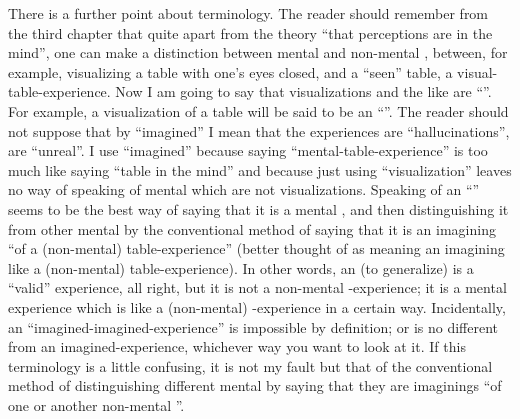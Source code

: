 There is a further point about terminology. The reader should remember from the third chapter that quite apart from the theory \enquote{that perceptions are in the mind}, one can make a distinction between mental and non-mental , between, for example, visualizing a table with one's eyes closed, and a \enquote{seen} table, a visual-table-experience. Now I am going to say that visualizations and the like are \enquote{}. For example, a visualization of a table will be said to be an \enquote{}. The reader should not suppose that by \enquote{imagined} I mean that the experiences are \enquote{hallucinations}, are \enquote{unreal}. I use \enquote{imagined} because saying \enquote{mental-table-experience} is too much like saying \enquote{table in the mind} and because just using \enquote{visualization} leaves no way of speaking of mental  which are not visualizations. Speaking of an \enquote{} seems to be the best way of saying that it is a mental , and then distinguishing it from other mental  by the conventional method of saying that it is an imagining \enquote{of a (non-mental) table-experience} (better thought of as meaning an imagining like a  (non-mental)  table-experience). In other words, an  (to generalize) is a \enquote{valid} experience, all right, but it is not a non-mental \x-experience; it is a mental experience which is like a (non-mental) \x-experience in a certain way. Incidentally, an \enquote{imagined-imagined-experience} is impossible by definition; or is no different from an imagined-experience, whichever way you want to look at it. If this terminology is a little confusing, it is not my fault but that of the conventional method of distinguishing different mental  by saying that they are imaginings \enquote{of one or another non-mental }. 

